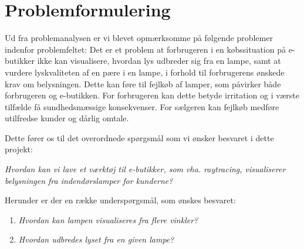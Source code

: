 \section{Problemformulering}

Ud fra problemanalysen er vi blevet opmærksomme på følgende problemer indenfor problemfeltet:
Det er et problem at forbrugeren i en købssituation på e-butikker ikke kan visualisere, hvordan lys udbreder sig fra en lampe, samt at vurdere lyskvaliteten af en pære i en lampe, i forhold til forbrugerens ønskede krav om belysningen. Dette kan føre til fejlkøb af lamper, som påvirker både forbrugeren og e-butikken. For forbrugeren kan dette betyde irritation og i værste tilfælde få sundhedsmæssige konsekvenser. For sælgeren kan fejlkøb medføre utilfredse kunder og dårlig omtale. 

Dette fører os til det overordnede spørgsmål som vi ønsker besvaret i dette projekt:

\textit{Hvordan kan vi lave et værktøj til e-butikker, som vha. raytracing, visualiserer belysningen fra indendørslamper for kunderne?}

Herunder er der en række underspørgsmål, som ønskes besvaret:

\begin{enumerate}

\item \textit{Hvordan kan lampen visualiseres fra flere vinkler?}
\item \textit{Hvordan udbredes lyset fra en given lampe?}

\end{enumerate}